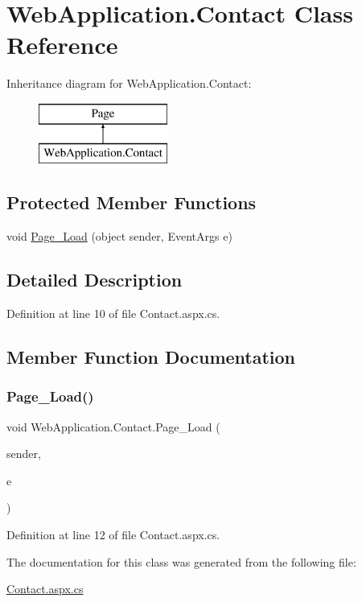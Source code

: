 \hypertarget{classWebApplication_1_1Contact}{}\section{Web\+Application.\+Contact Class Reference}
\label{classWebApplication_1_1Contact}
Inheritance diagram for Web\+Application.\+Contact\+:\begin{figure}[H]
\begin{center}
\leavevmode
\includegraphics[height=2.000000cm]{dc/dc0/classWebApplication_1_1Contact}
\end{center}
\end{figure}
\subsection*{Protected Member Functions}
\begin{DoxyCompactItemize}
\item 
void \mbox{\hyperlink{classWebApplication_1_1Contact_ab1f67b66acd64d7edf13c0096c067eac}{Page\+\_\+\+Load}} (object sender, Event\+Args e)
\end{DoxyCompactItemize}


\subsection{Detailed Description}


Definition at line 10 of file Contact.\+aspx.\+cs.



\subsection{Member Function Documentation}
\mbox{\label{classWebApplication_1_1Contact_ab1f67b66acd64d7edf13c0096c067eac}} 
\subsubsection{\texorpdfstring{Page\_Load()}{Page\_Load()}}
{\footnotesize\ttfamily void Web\+Application.\+Contact.\+Page\+\_\+\+Load (\begin{DoxyParamCaption}\item[{object}]{sender,  }\item[{Event\+Args}]{e }\end{DoxyParamCaption})\hspace{0.3cm}{\ttfamily [protected]}}



Definition at line 12 of file Contact.\+aspx.\+cs.



The documentation for this class was generated from the following file\+:\begin{DoxyCompactItemize}
\item 
\mbox{\hyperlink{Contact_8aspx_8cs}{Contact.\+aspx.\+cs}}\end{DoxyCompactItemize}
